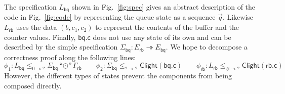 \documentclass[acmsmall,nonacm]{acmart}
\newcommand{\kw}[1]{\ensuremath{ \mathsf{#1} }}
\newcommand{\emptysig}{0}
\begin{document}
\begin{example} \label{ex:abspec} %
The specification $L_\kw{bq}$ shown in Fig.~\ref{fig:spec}
gives an abstract description of the code in Fig.~\ref{fig:code}
by representing the queue state as a sequence $\vec{q}$.
Likewise $L_\kw{rb}$ uses the data $(b, c_1, c_2)$
to represent the contents of the buffer and the counter values.
Finally,
$\kw{bq.c}$ does not use any state of its own
and can be described by the simple 
specification
$
  \Sigma_\kw{bq} : E_\kw{rb} \twoheadrightarrow E_\kw{bq}
$.
%
We hope to decompose a correctness proof
along the following lines:
\[
    \phi_1 : L_\kw{bq}
      \le_{\emptysig \twoheadrightarrow ?}
      \Sigma_\kw{bq} \! \mathbin{\text{``}{\odot}\text{''}} \Gamma_\kw{rb}
    \qquad
    \phi_2 : \Sigma_\kw{bq}
      \le_{? \twoheadrightarrow ?}
      \kw{Clight}(\kw{bq.c})
    \qquad
    \phi_\kw{rb} : L_\kw{rb}
      \le_{\varnothing \twoheadrightarrow ?}
      \kw{Clight}(\kw{rb.c})
\]
However, the different types of states
prevent the components
from being composed directly.
\end{example}
\end{document}
